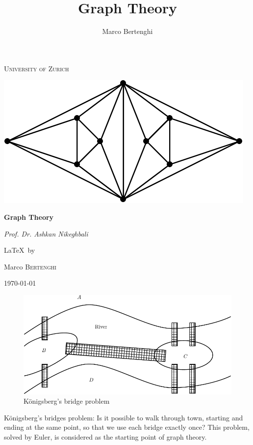 \documentclass[12pt,a4paper]{article}
\author{Marco Bertenghi}
\title{Graph Theory}
\date{}
\theoremstyle{definition}
\begin{document}
\begin{titlepage}
	\centering
	
	{\scshape\LARGE University of Zurich \par}
	\vspace{2cm}
\includegraphics[width=.8\textwidth]{logo1.pdf}\par\vspace{1cm}
	\vspace{1cm}
	{\huge\bfseries Graph Theory\par}
	\vspace{2cm}
	{\Large\itshape Prof. Dr. Ashkan Nikeghbali\par}
	\vfill
	\LaTeX \ by\par
	Marco \textsc{Bertenghi}

	\vfill

	{\large \today\par}
\end{titlepage}
\newpage
\thispagestyle{empty}
\tableofcontents
\newpage
\maketitle
\begin{figure}[hbtp]
\centering
\includegraphics[scale=.7]{images/koenigsberger.pdf}
\caption{Königsberg's bridge problem}
\end{figure}
Königsberg's bridges problem: Is it possible to walk through town,  starting and ending at the same point, so that we use each bridge exactly once? This problem, solved by Euler, is considered as the starting point of graph theory. 
\end{document}
